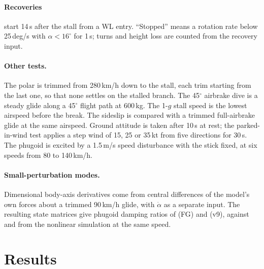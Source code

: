 \documentclass[10pt,a4paper,twocolumn]{article}
\newcommand{\vnine}{v9}
\newcommand{\FG}{FG}
\begin{document}
\paragraph{Recoveries} start 14\,s after the stall from a WL entry. ``Stopped'' means a rotation rate below 25\,deg/s with
$\alpha<16^\circ$ for 1\,s; turns and height loss are counted from the recovery input.
\paragraph{Other tests.} The polar is trimmed from 280\,km/h down to the stall, each trim starting from the last one, so that none
settles on the stalled branch. The 45$^\circ$ airbrake dive is a steady glide along a 45$^\circ$ flight path at 600\,kg. The 1-$g$ stall
speed is the lowest airspeed before the break. The sideslip is compared with a trimmed full-airbrake glide at the same airspeed.
Ground attitude is taken after 10\,s at rest; the parked-in-wind test applies a step wind of 15, 25 or 35\,kt from five directions
for 30\,s. The phugoid is excited by a 1.5\,m/s speed disturbance with the stick fixed, at six speeds from 80 to 140\,km/h.
\paragraph{Small-perturbation modes.} Dimensional body-axis derivatives come from central differences of the model's own
forces about a trimmed 90\,km/h glide, with $\dot\alpha$ as a separate input. The resulting state matrices give phugoid damping
ratios of \NphZFg{} (\FG) and \NphZNine{} (\vnine), against \NphzBFg{} and \NphzBNine{} from the nonlinear simulation at the same speed.

\section{Results}
\end{document}
